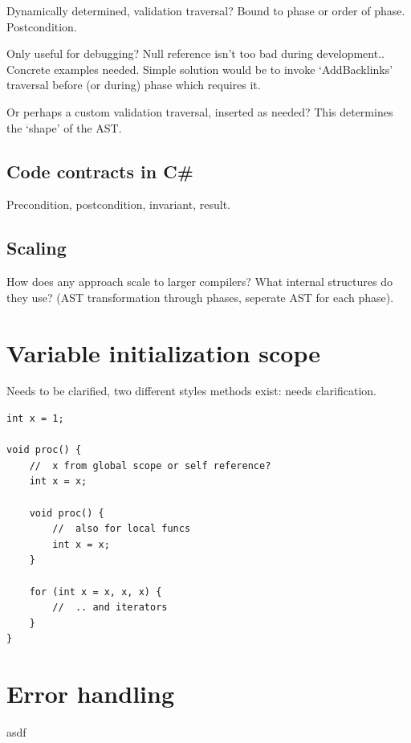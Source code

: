 \documentclass[final,a4paper,12pt]{article}
\begin{document}
Dynamically determined, validation traversal? Bound to phase or order of phase. Postcondition.

Only useful for debugging? Null reference isn't too bad during development.. Concrete examples needed. Simple solution would be to invoke `AddBacklinks' traversal before (or during) phase which requires it.

Or perhaps a custom validation traversal, inserted as needed? This determines the `shape' of the AST.

\subsection*{Code contracts in C\#}
Precondition, postcondition, invariant, result.

\subsection*{Scaling}
How does any approach scale to larger compilers? What internal structures do they use? (AST transformation through phases, seperate AST for each phase).

\section*{Variable initialization scope}
Needs to be clarified, two different styles methods exist: needs clarification.

\begin{lstlisting}[caption=Ambiguity in variable references]
int x = 1;

void proc() {
	//	x from global scope or self reference?
	int x = x;

	void proc() {
		//	also for local funcs
		int x = x;
	}

	for (int x = x, x, x) {
		//	.. and iterators
	}
}
\end{lstlisting}

\section*{Error handling}
asdf
\end{document}
